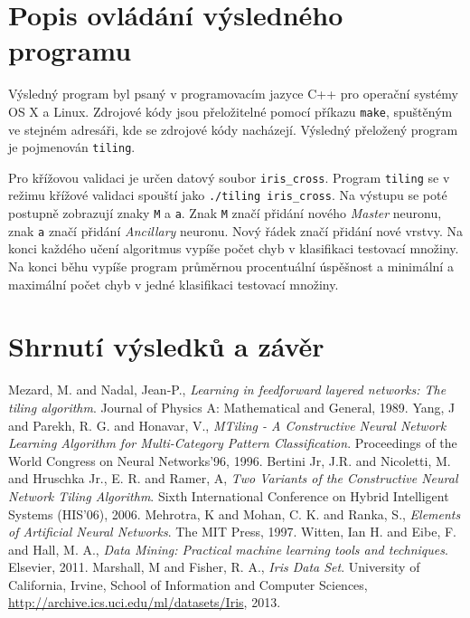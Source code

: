 \documentclass[a4paper, 11pt]{article}
\begin{document}
\section*{Popis ovládání výsledného programu}
Výsledný program byl psaný v programovacím jazyce C++ pro operační systémy OS X a Linux. Zdrojové kódy jsou přeložitelné pomocí příkazu {\tt make}, spuštěným ve stejném adresáři, kde se zdrojové kódy nacházejí. Výsledný přeložený program je pojmenován {\tt tiling}.

Pro křížovou validaci je určen datový soubor {\tt iris_cross}. Program {\tt tiling} se v režimu křížové validaci spouští jako {\tt ./tiling iris_cross}. Na výstupu se poté postupně zobrazují znaky {\tt M} a {\tt a}. Znak {\tt M} značí přidání nového \emph{Master} neuronu, znak {\tt a} značí přidání \emph{Ancillary} neuronu. Nový řádek značí přidání nové vrstvy. Na konci každého učení algoritmus vypíše počet chyb v klasifikaci testovací množiny. Na konci běhu vypíše program průměrnou procentuální úspěšnost a minimální a maximální počet chyb v jedné klasifikaci testovací množiny.

\section*{Shrnutí výsledků a závěr}

\begin{thebibliography}{9}
  Mezard, M. and Nadal, Jean-P.,
  \emph{Learning in feedforward layered networks: The tiling algorithm}.
  Journal of Physics A: Mathematical and General,
  1989.
  Yang, J and  Parekh, R. G. and Honavar, V.,
  \emph{MTiling - A Constructive Neural Network Learning Algorithm for Multi-Category Pattern Classification}.
  Proceedings of the World Congress on Neural Networks'96,
  1996.
  Bertini Jr, J.R. and Nicoletti, M. and Hruschka Jr., E. R. and Ramer, A,
  \emph{Two Variants of the Constructive Neural Network Tiling Algorithm}.
  Sixth International Conference on Hybrid Intelligent Systems (HIS'06),
  2006.
  Mehrotra, K and Mohan, C. K. and Ranka, S.,
  \emph{Elements of Artificial Neural Networks}.
  The MIT Press,
  1997.
  Witten, Ian H. and Eibe, F. and Hall, M. A.,
  \emph{Data Mining: Practical machine learning tools and techniques}.
  Elsevier,
  2011.
  Marshall, M and Fisher, R. A.,
  \emph{Iris Data Set}.
  University of California, Irvine, School of Information and Computer Sciences,
  \url{http://archive.ics.uci.edu/ml/datasets/Iris},
  2013.
\end{thebibliography}
\end{document}
